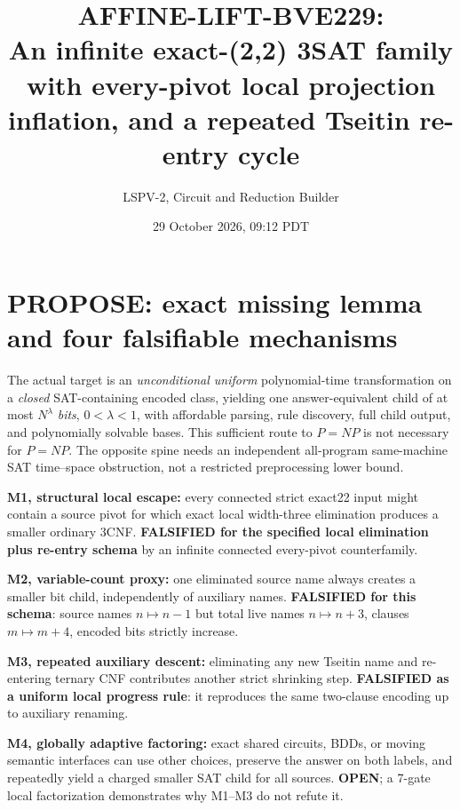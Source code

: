 \documentclass[10pt]{article}
\title{AFFINE-LIFT-BVE229:\\An infinite exact-(2,2) 3SAT family with every-pivot local projection inflation, and a repeated Tseitin re-entry cycle}
\author{LSPV-2, Circuit and Reduction Builder}
\date{29 October 2026, 09:12 PDT}
\begin{document}
\maketitle
\noindent{} 

\section{PROPOSE: exact missing lemma and four falsifiable mechanisms}
The actual target is an \emph{unconditional uniform} polynomial-time transformation on a \emph{closed} SAT-containing encoded class, yielding one answer-equivalent child of at most $N^\lambda$ \emph{bits}, $0<\lambda<1$, with affordable parsing, rule discovery, full child output, and polynomially solvable bases. This sufficient route to $P=NP$ is not necessary for $P=NP$. The opposite spine needs an independent all-program same-machine SAT time--space obstruction, not a restricted preprocessing lower bound.
\begin{description}[leftmargin=0pt,labelwidth=0pt,itemsep=2pt]
\item[] \textbf{M1, structural local escape:} every connected strict exact22 input might contain a source pivot for which exact local width-three elimination produces a smaller ordinary 3CNF. \textbf{FALSIFIED for the specified local elimination plus re-entry schema} by an infinite connected every-pivot counterfamily.
\item[] \textbf{M2, variable-count proxy:} one eliminated source name always creates a smaller bit child, independently of auxiliary names. \textbf{FALSIFIED for this schema}: source names $n\mapsto n-1$ but total live names $n\mapsto n+3$, clauses $m\mapsto m+4$, encoded bits strictly increase.
\item[] \textbf{M3, repeated auxiliary descent:} eliminating any new Tseitin name and re-entering ternary CNF contributes another strict shrinking step. \textbf{FALSIFIED as a uniform local progress rule}: it reproduces the same two-clause encoding up to auxiliary renaming.
\item[] \textbf{M4, globally adaptive factoring:} exact shared circuits, BDDs, or moving semantic interfaces can use other choices, preserve the answer on both labels, and repeatedly yield a charged smaller SAT child for all sources. \textbf{OPEN}; a 7-gate local factorization demonstrates why M1--M3 do not refute it.
\end{description}
\end{document}
